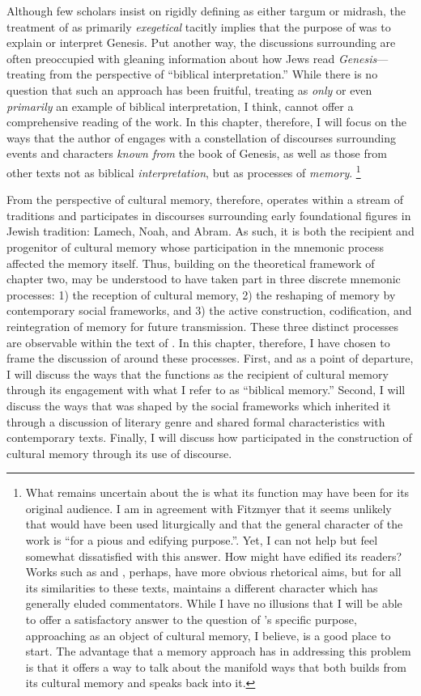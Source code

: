 Although few scholars insist on rigidly defining \ga as either targum or midrash, the treatment of \ga as primarily \emph{exegetical} tacitly implies that the purpose of \ga was to explain or interpret Genesis. Put another way, the discussions surrounding \ga are often preoccupied with gleaning information about how \secondtemple Jews read \emph{Genesis}---treating \ga from the perspective of ``biblical interpretation.'' While there is no question that such an approach has been fruitful, treating \ga as \emph{only} or even \emph{primarily} an example of biblical interpretation, I think, cannot offer a comprehensive reading of the work. In this chapter, therefore, I will focus on the ways that the author of \ga engages with a  constellation of discourses surrounding events and characters \emph{known from} the book of Genesis, as well as those from other texts not as biblical \emph{interpretation}, but as processes of \emph{memory}.%
%
\footnote{What remains uncertain about the \ga is what its function may have been for its original audience. I am in agreement with Fitzmyer that it seems unlikely that \ga would have been used liturgically and that the general character of the work is ``for a pious and edifying purpose.''\textcite[20]{fitzmyer2004}. Yet, I can not help but feel somewhat dissatisfied with this answer. How might \ga have edified its readers? Works such as \jub and \firstenoch, perhaps, have more obvious rhetorical aims, but for all its similarities to these texts, \ga maintains a different character which has generally eluded commentators. While I have no illusions that I will be able to offer a satisfactory answer to the question of \ga's specific purpose, approaching \ga as an object of cultural memory, I believe, is a good place to start. The advantage that a memory approach has in addressing this problem is that it offers a way to talk about the manifold ways that \ga both builds from its cultural memory and speaks back into it.}

From the perspective of cultural memory, therefore, \ga operates within a stream of traditions and participates in discourses surrounding early foundational figures in Jewish tradition: Lamech, Noah, and Abram. As such, it is both the recipient and progenitor of cultural memory whose participation in the mnemonic process affected the memory itself. Thus, building on the theoretical framework of chapter two, \ga may be understood to have taken part in three discrete mnemonic processes: 1) the reception of cultural memory, 2) the reshaping of memory by contemporary social frameworks, and 3) the active construction, codification, and reintegration of memory for future transmission. These three distinct processes are observable within the text of \ga. In this chapter, therefore, I have chosen to frame the discussion of \ga around these processes. First, and as a point of departure, I will discuss the ways that the \ga functions as the recipient of cultural memory through its engagement with what I refer to as  ``biblical memory.'' Second, I will discuss the ways that \ga was shaped by the social frameworks which inherited it through a discussion of literary genre and shared formal characteristics with contemporary texts. Finally, I will discuss how \ga participated in the construction of cultural memory through its use of \psgraphical discourse.
